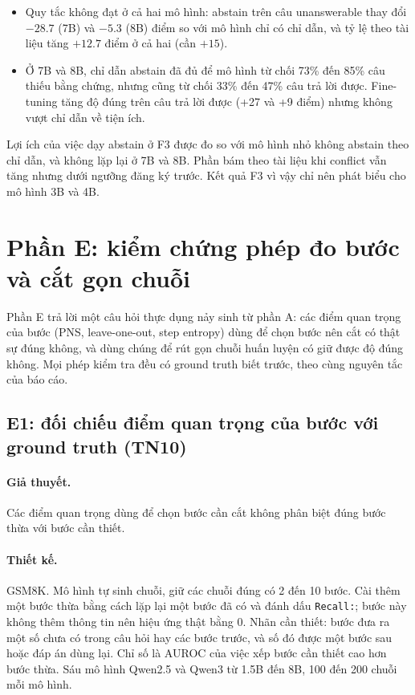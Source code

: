 \documentclass[11pt]{article}
\begin{document}
\begin{cachdoc}
\begin{itemize}[leftmargin=*,itemsep=1pt]
\item Quy tắc không đạt ở cả hai mô hình: abstain trên câu unanswerable thay đổi $-28.7$ (7B) và $-5.3$ (8B)
  điểm so với mô hình chỉ có chỉ dẫn, và tỷ lệ theo tài liệu tăng $+12.7$ điểm ở cả hai (cần $+15$).
\item Ở 7B và 8B, chỉ dẫn abstain đã đủ để mô hình từ chối 73\% đến 85\% câu thiếu bằng chứng, nhưng cũng
  từ chối 33\% đến 47\% câu trả lời được. Fine-tuning tăng độ đúng trên câu trả lời được (+27 và +9
  điểm) nhưng không vượt chỉ dẫn về tiện ích.
\end{itemize}
\end{cachdoc}

\begin{ketluan}
Lợi ích của việc dạy abstain ở F3 được đo so với mô hình nhỏ không abstain theo chỉ dẫn, và không lặp lại
ở 7B và 8B. Phần bám theo tài liệu khi conflict vẫn tăng nhưng dưới ngưỡng đăng ký trước. Kết quả F3 vì vậy
chỉ nên phát biểu cho mô hình 3B và 4B.
\end{ketluan}

\section{Phần E: kiểm chứng phép đo bước và cắt gọn chuỗi}

Phần E trả lời một câu hỏi thực dụng nảy sinh từ phần A: các điểm quan trọng của bước (PNS, leave-one-out,
step entropy) dùng để chọn bước nên cắt có thật sự đúng không, và dùng chúng để rút gọn chuỗi huấn luyện
có giữ được độ đúng không. Mọi phép kiểm tra đều có ground truth biết trước, theo cùng nguyên tắc của
báo cáo.

\subsection{E1: đối chiếu điểm quan trọng của bước với ground truth (TN10)}

\paragraph{Giả thuyết.} Các điểm quan trọng dùng để chọn bước cần cắt không phân biệt đúng bước thừa với
bước cần thiết.

\paragraph{Thiết kế.} GSM8K. Mô hình tự sinh chuỗi, giữ các chuỗi đúng có 2 đến 10 bước. Cài thêm một
bước thừa bằng cách lặp lại một bước đã có và đánh dấu \texttt{Recall:}; bước này không thêm thông tin nên
hiệu ứng thật bằng 0. Nhãn cần thiết: bước đưa ra một số chưa có trong câu hỏi hay các bước trước, và số
đó được một bước sau hoặc đáp án dùng lại. Chỉ số là AUROC của việc xếp bước cần thiết cao hơn bước thừa.
Sáu mô hình Qwen2.5 và Qwen3 từ 1.5B đến 8B, 100 đến 200 chuỗi mỗi mô hình.
\end{document}
